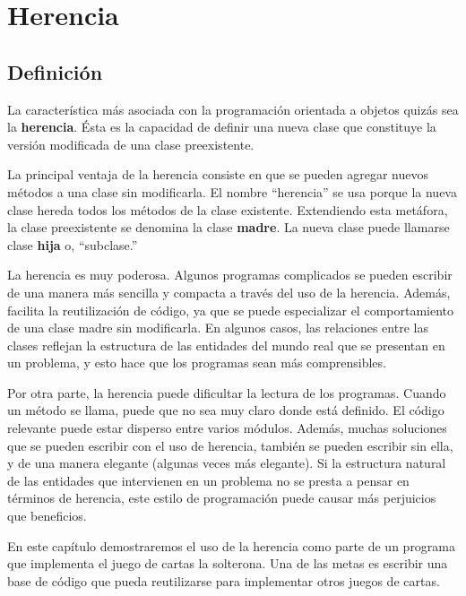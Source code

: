 
\chapter{Herencia}

\section{Definición}

  
 

La característica más asociada con la programación orientada a objetos
quizás sea la \textbf{herencia}. Ésta es la capacidad de definir una
nueva clase que constituye la versión modificada de una clase preexistente.

La principal ventaja de la herencia consiste en que se pueden agregar
nuevos métodos a una clase sin modificarla. El nombre ``herencia''
se usa porque la nueva clase hereda todos los métodos de la clase
existente. Extendiendo esta metáfora, la clase preexistente se denomina
la clase \textbf{madre}. La nueva clase puede llamarse clase \textbf{hija}
o, ``subclase.''


La herencia es muy poderosa. Algunos programas complicados se pueden
escribir de una manera más sencilla y compacta a través del uso de
la herencia. Además, facilita la reutilización de código, ya que se
puede especializar el comportamiento de una clase madre sin modificarla.
En algunos casos, las relaciones entre las clases reflejan la estructura
de las entidades del mundo real que se presentan en un problema, y
esto hace que los programas sean más comprensibles.

Por otra parte, la herencia puede dificultar la lectura de los programas.
Cuando un método se llama, puede que no sea muy claro donde está definido.
El código relevante puede estar disperso entre varios módulos. Además,
muchas soluciones que se pueden escribir con el uso de herencia, también
se pueden escribir sin ella, y de una manera elegante (algunas veces
más elegante). Si la estructura natural de las entidades que intervienen
en un problema no se presta a pensar en términos de herencia, este
estilo de programación puede causar más perjuicios que beneficios.

En este capítulo demostraremos el uso de la herencia como parte de
un programa que implementa el juego de cartas la solterona. Una de
las metas es escribir una base de código que pueda reutilizarse para
implementar otros juegos de cartas.

